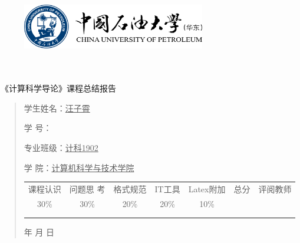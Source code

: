 \documentclass{article}
\renewcommand{\today}{\number\year 年 \number\month 月 \number\day 日}
\begin{document}
\begin{figure}
    \centering
    \includegraphics[width=8cm]{upc.png}

    \label{figupc}
\end{figure}

	\begin{center}
		\quad \\
		\quad \\
		\heiti \fontsize{45}{17} \quad \quad \quad 
		\vskip 1.5cm
		\heiti {} 《计算科学导论》课程总结报告
	\end{center}
	\vskip 2.0cm
		
	\begin{quotation}
		\doublespacing
		
        \par\setlength\parindent{7em}
		\quad 

		学生姓名：\underline{\qquad  汪子霄 \qquad \qquad}

		学\hspace{0.61cm} 号：\underline{\qquad}
		
		专业班级：\underline{\qquad 计科1902 \qquad  }
		
        学\hspace{0.61cm} 院：\underline{计算机科学与技术学院}
		\vskip 2cm
		\centering
		\begin{table}[h]
            \centering 
            \begin{tabular}{|c|c|c|c|c|c|c|}
                \hline
                课程认识 & 问题思 考 & 格式规范  & IT工具  & Latex附加  & 总分 & 评阅教师 \\
                30\% & 30\% & 20\% & 20\% & 10\% &  &  \\
                \hline
                 & & & & & &\\
                & & & & & &\\
                \hline
            \end{tabular}
        \end{table}
		\vskip 2cm
		\today
	\end{quotation}
\end{document}
